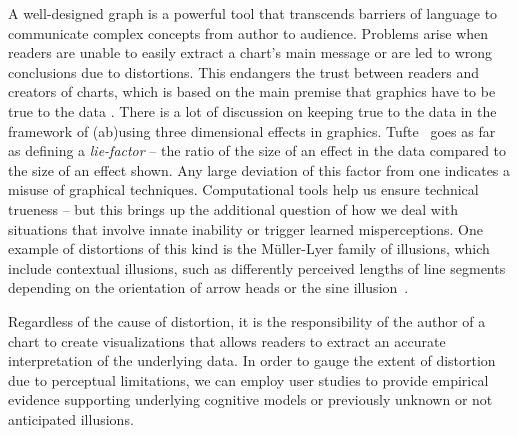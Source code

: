 

% 
% 
% 
% 
A well-designed graph is a powerful tool 
that transcends barriers of language to
communicate complex concepts from author to audience. 
Problems arise when readers are unable to easily extract a chart's main message or are led to wrong conclusions due to distortions.
This endangers the trust between readers and creators of charts, which is based on the main premise that
graphics have to be true to the data \cite{tufte, wainer:2000, robbins:2005}.
There is a lot of discussion on keeping true to the data in the framework of (ab)using three dimensional effects in graphics. Tufte~\cite{tufte} goes as far as defining a {\it lie-factor} -- the ratio of the size of an effect in the data compared to the size of an effect shown. Any large deviation of this factor from one indicates a misuse of graphical techniques. Computational tools help us ensure technical trueness -- but this brings up the additional question of how we deal with situations that involve innate inability or trigger learned misperceptions.
One example of distortions of this kind is the 
 M\"{u}ller-Lyer family of illusions, which include contextual illusions,  such as differently perceived lengths of line segments depending on the orientation of arrow heads  
 or the sine illusion~\cite{day:1991}.

Regardless of the cause of distortion, it is the responsibility of the  author of a chart to create visualizations that
 allows readers to extract an accurate interpretation of the underlying data.  In order to gauge the
extent of distortion due to perceptual limitations, we can employ user studies   to provide empirical evidence supporting 
underlying cognitive models or previously unknown or not anticipated illusions.




